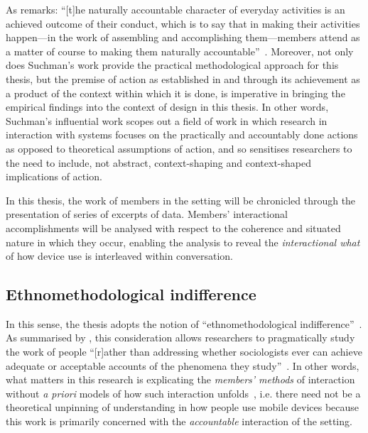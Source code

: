As \citet{Crabtree2012} remarks: ``[t]he naturally accountable character of everyday activities is an achieved outcome of their conduct, which is to say that in making their activities happen---in the work of assembling and accomplishing them---members attend as a matter of course to making them naturally accountable''~\citep[p. 25]{Crabtree2012}.
Moreover, not only does Suchman's work provide the practical methodological approach for this thesis, but the premise of action as established in and through its achievement as a product of the context within which it is done, is imperative in bringing the empirical findings into the context of design in this thesis.
In other words, Suchman's influential work scopes out a field of work in which research in interaction with systems focuses on the practically and accountably done actions as opposed to theoretical assumptions of action, and so sensitises researchers to the need to include, not abstract, context-shaping and context-shaped implications of action.

In this thesis, the work of members in the setting will be chronicled through the presentation of series of excerpts of data.
Members' interactional accomplishments will be analysed with respect to the coherence and situated nature in which they occur, enabling the analysis to reveal the \textit{interactional what} of how device use is interleaved within conversation.






\subsection{Ethnomethodological indifference}\label{sec:background approach em indifference}
In this sense, the thesis adopts the notion of ``ethnomethodological indifference''~\citep{Garfinkel1970}.
As summarised by \citet{Lynch1993}, this consideration allows researchers to pragmatically study the work of people ``[r]ather than addressing whether sociologists ever can achieve adequate or acceptable accounts of the phenomena they study''~\citep[p. 141]{Lynch1993}.
In other words, what matters in this research is explicating the \textit{members' methods} of interaction without \textit{a priori} models of how such interaction unfolds~\citep{Livingston1987}, i.e. there need not be a theoretical unpinning of understanding in how people use mobile devices because this work is primarily concerned with the \textit{accountable} interaction of the setting.

